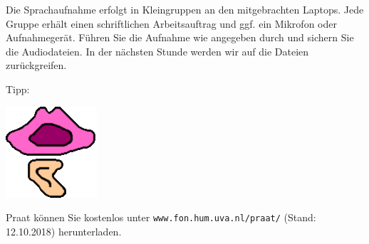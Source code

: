 \documentclass[11pt]{book}
\begin{document}
Die Sprachaufnahme erfolgt in Kleingruppen an den mitgebrachten Laptops. Jede Gruppe erhält einen schriftlichen Arbeitsauftrag und ggf. ein Mikrofon oder Aufnahmegerät. Führen Sie die Aufnahme wie angegeben durch und sichern Sie die Audiodateien. In der nächsten Stunde werden wir auf die Dateien zurückgreifen.
\vspace*{7cm} 

Tipp: \newline \\ 

\begin {minipage} {0.1\textwidth}
\includegraphics[width=\textwidth]{grafiken/sprachaufnahme/praat.png}
\end{minipage}
\hspace {1cm}
\begin{minipage} {0.7\textwidth}
Praat können Sie kostenlos unter {\tt www.fon.hum.uva.nl/praat/} (Stand: 12.10.2018) herunterladen. 
\end {minipage}
\end{document}
